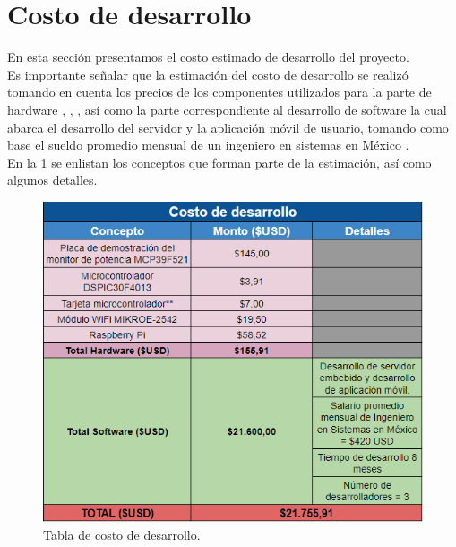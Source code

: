\section{Costo de desarrollo}
En esta sección presentamos el costo estimado de desarrollo del proyecto. \\
Es importante señalar que la estimación del costo de desarrollo se realizó tomando en cuenta los precios de los componentes utilizados para la parte de hardware \citep{MarcoTeorico5}, \citep{PlacaMCP}, \citep{PrecioDSPIC}, \citep{PrecioRasp} así como la parte correspondiente al desarrollo de software la cual abarca el desarrollo del servidor y la aplicación móvil de usuario, tomando como base el sueldo promedio mensual de un ingeniero en sistemas en México \citep{SalarioPromedio}.\\ 

En la \ref{fig:CostoDesarrollo} se enlistan los conceptos que forman parte de la estimación, así como algunos detalles.

\begin{figure}[H]
	\centering
	\includegraphics[scale=.8]{Capitulo3/img/CostoDesarrollo.PNG}
	\caption{Tabla de costo de desarrollo.}	\label{fig:CostoDesarrollo}
\end{figure} 




